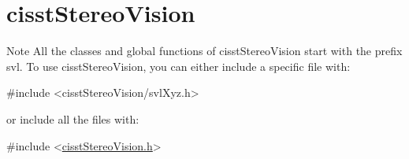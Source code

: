 \hypertarget{group__cisst_stereo_vision}{}\section{cisst\+Stereo\+Vision}
\label{group__cisst_stereo_vision}
\begin{DoxyNote}{Note}
All the classes and global functions of cisst\+Stereo\+Vision start with the prefix svl. To use cisst\+Stereo\+Vision, you can either include a specific file with\+: 
\begin{DoxyCode}
\textcolor{preprocessor}{#include <cisstStereoVision/svlXyz.h>}
\end{DoxyCode}
 or include all the files with\+: 
\begin{DoxyCode}
\textcolor{preprocessor}{#include <\hyperlink{cisst_stereo_vision_8h}{cisstStereoVision.h}>}
\end{DoxyCode}
 
\end{DoxyNote}
